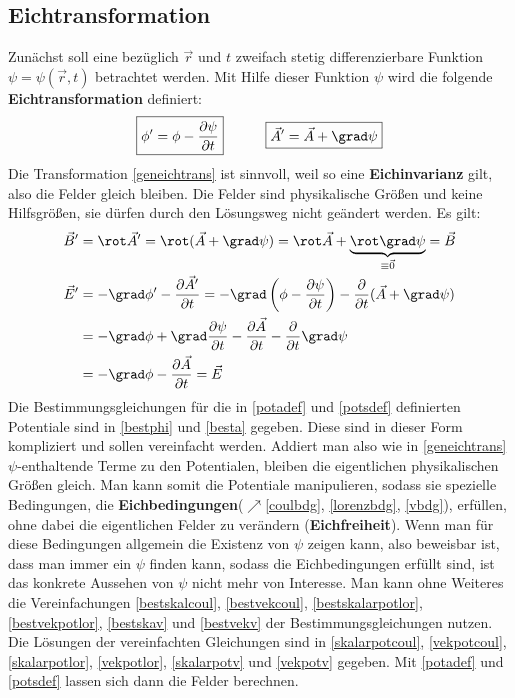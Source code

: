 \subsection{Eichtransformation}
Zunächst soll eine bezüglich $\vec{{r}}$ und ${t}$ zweifach stetig differenzierbare Funktion $\psi=\psi(\vec{r}, {t})$ betrachtet werden. Mit Hilfe dieser Funktion $\psi$ wird die folgende \textbf{Eichtransformation} definiert:
\begin{equation}\label{geneichtrans}
	\boxed{\phi^{\prime}=\phi-\frac{\partial \psi}{\partial {t}}} \quad\quad\quad \boxed{ \vec{{A}}^{\prime}=\vec{{A}}+\grad \psi }
\end{equation}
Die Transformation \ref{geneichtrans} ist sinnvoll, weil so eine \textbf{Eichinvarianz} gilt, also die Felder gleich bleiben. Die Felder sind physikalische Größen und keine Hilfsgrößen, sie dürfen durch den Lösungsweg nicht geändert werden. Es gilt:
\begin{align*}
	\vec{B}^{\prime}&=\rot \vec{{A}}^{\prime}=\rot(\vec{{A}}+\grad \psi)=\rot \vec{{A}}+\underbrace{\rot \grad \psi}_{\equiv \vec{0}}=\vec{{B}}  \\
	\vec{E}^{\prime}&=-\grad \phi^{\prime}-\frac{\partial \vec{{A}}^{\prime}}{\partial {t}}=-\grad\left(\phi-\frac{\partial \psi}{\partial {t}}\right)-\frac{\partial}{\partial {t}}(\vec{{A}}+\grad \psi) \\
	&=-\grad \phi+\grad \frac{\partial \psi}{\partial {t}}-\frac{\partial \vec{{A}}}{\partial {t}}-\frac{\partial}{\partial {t}} \grad \psi \\
	&=-\grad \phi-\frac{\partial \vec{{A}}}{\partial {t}}=\vec{E}
\end{align*}
Die Bestimmungsgleichungen für die in \ref{potadef} und \ref{potsdef} definierten Potentiale sind in \ref{bestphi} und \ref{besta} gegeben. Diese sind in dieser Form kompliziert und sollen vereinfacht werden. Addiert man also wie in \ref{geneichtrans} $\psi$-enthaltende Terme zu den Potentialen, bleiben die eigentlichen physikalischen Größen gleich. Man kann somit die Potentiale manipulieren, sodass sie spezielle Bedingungen, die \textbf{Eichbedingungen}($\nearrow$\ref{coulbdg}, \ref{lorenzbdg}, \ref{vbdg}), erfüllen, ohne dabei die eigentlichen Felder zu verändern (\textbf{Eichfreiheit}). Wenn man für diese Bedingungen allgemein die Existenz von $\psi$ zeigen kann, also beweisbar ist, dass man immer ein $\psi$ finden kann, sodass die Eichbedingungen erfüllt sind, ist das konkrete Aussehen von $\psi$ nicht mehr von Interesse. Man kann ohne Weiteres die Vereinfachungen \ref{bestskalcoul}, \ref{bestvekcoul}, \ref{bestskalarpotlor}, \ref{bestvekpotlor}, \ref{bestskav} und \ref{bestvekv} der Bestimmungsgleichungen nutzen. Die Lösungen der vereinfachten Gleichungen sind in \ref{skalarpotcoul}, \ref{vekpotcoul}, \ref{skalarpotlor}, \ref{vekpotlor}, \ref{skalarpotv} und \ref{vekpotv} gegeben. Mit \ref{potadef} und \ref{potsdef} lassen sich dann die Felder berechnen.

